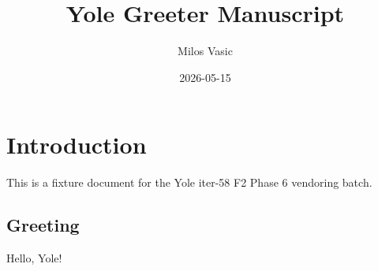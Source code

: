\documentclass{article}
\title{Yole Greeter Manuscript}
\author{Milos Vasic}
\date{2026-05-15}
\begin{document}
\maketitle

\section{Introduction}
This is a fixture document for the Yole iter-58 F2 Phase 6 vendoring batch.

\subsection{Greeting}
Hello, Yole!
\end{document}
